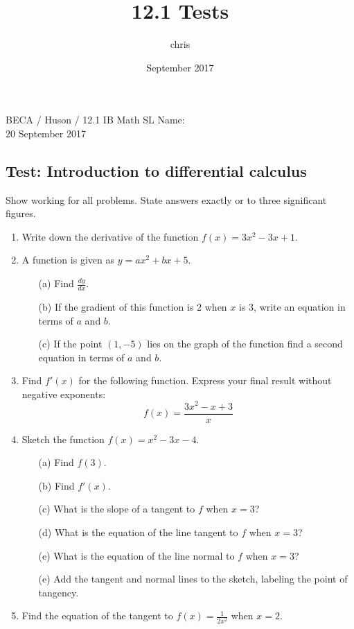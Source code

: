 \documentclass{article}
\title{12.1 Tests}
\author{chris }
\date{September 2017}
\begin{document}
\noindent BECA / Huson / 12.1 IB Math SL \qquad \qquad Name:\\
20 September 2017
\subsection*{Test: Introduction to differential calculus}
Show working for all problems. State answers exactly or to three significant figures.

\begin{enumerate}

\item Write down the derivative of the function $f(x) = 3x^2 - 3x + 1$.

\item	A function is given as $y = ax^2 + bx + 5$.

\begin{itemize}
    \item[(a)] Find $\displaystyle \frac {dy}{dx}$.
	\item[(b)] If the gradient of this function is 2 when $x$ is 3, write an equation in terms of $a$ and $b$.
	\item[(c)] If the point $(1, -5)$ lies on the graph of the function find a second equation in terms of $a$ and $b$.
\end{itemize}

\item Find $f'(x)$  for the following function. Express your final result without negative exponents:
	 \[	f(x) = \frac{3x^2-x+3}{x}\]

\item	Sketch the function $f(x) = x^2 - 3x - 4$.
\begin{itemize}
    \item[(a)] Find $f(3)$.
	\item[(b)] Find $f'(x)$.
	\item[(c)] What is the slope of a tangent to $f$ when $x=3$?
	\item[(d)] What is the equation of the line tangent to $f$ when $x=3$?
	\item[(e)] What is the equation of the line normal to $f$ when $x=3$?
	\item[(e)] Add the tangent and normal lines to the sketch, labeling the point of tangency.
\end{itemize}
	 
\item Find the equation of the tangent to $\displaystyle f(x) = \frac{1}{2x^2}$ when $x = 2$.


\end{enumerate}
\end{document}
